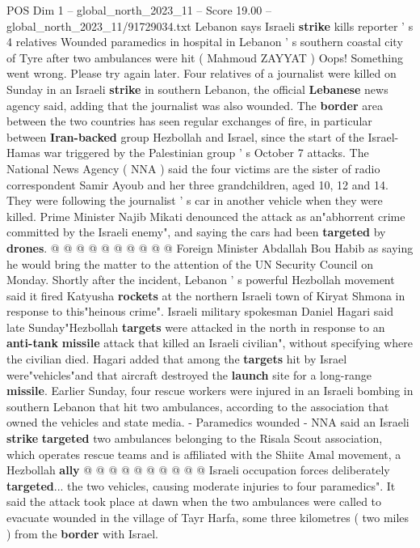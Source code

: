 \begin{textsample}{POS Dim 1 – global\_north\_2023\_11 – Score 19.00 – global\_north\_2023\_11/91729034.txt}  \label{ex:f1_pos_353}
Lebanon says Israeli \textbf{strike} kills reporter ' s 4 relatives Wounded paramedics in hospital in Lebanon ' s southern coastal city of Tyre after two ambulances were hit ( Mahmoud ZAYYAT ) Oops!
Something went wrong.
Please try again later.
Four relatives of a journalist were killed on Sunday in an Israeli \textbf{strike} in southern Lebanon, the official \textbf{Lebanese} news agency said, adding that the journalist was also wounded.
The \textbf{border} area between the two countries has seen regular exchanges of fire, in particular between \textbf{Iran-backed} group Hezbollah and Israel, since the start of the Israel-Hamas war triggered by the Palestinian group ' s October 7 attacks.
The National News Agency ( NNA ) said the four victims are the sister of radio correspondent Samir Ayoub and her three grandchildren, aged 10, 12 and 14.
They were following the journalist ' s car in another vehicle when they were killed.
Prime Minister Najib Mikati denounced the attack as an"abhorrent crime committed by the Israeli enemy", and saying the cars had been \textbf{targeted} by \textbf{drones}. @ @ @ @ @ @ @ @ @ @ Foreign Minister Abdallah Bou Habib as saying he would bring the matter to the attention of the UN Security Council on Monday.
Shortly after the incident, Lebanon ' s powerful Hezbollah movement said it fired Katyusha \textbf{rockets} at the northern Israeli town of Kiryat Shmona in response to this"heinous crime".
Israeli military spokesman Daniel Hagari said late Sunday"Hezbollah \textbf{targets} were attacked in the north in response to an \textbf{anti-tank} \textbf{missile} attack that killed an Israeli civilian", without specifying where the civilian died.
Hagari added that among the \textbf{targets} hit by Israel were"vehicles"and that aircraft destroyed the \textbf{launch} site for a long-range \textbf{missile}.
Earlier Sunday, four rescue workers were injured in an Israeli bombing in southern Lebanon that hit two ambulances, according to the association that owned the vehicles and state media. - Paramedics wounded - NNA said an Israeli \textbf{strike} \textbf{targeted} two ambulances belonging to the Risala Scout association, which operates rescue teams and is affiliated with the Shiite Amal movement, a Hezbollah \textbf{ally} @ @ @ @ @ @ @ @ @ @ Israeli occupation forces deliberately \textbf{targeted}... the two vehicles, causing moderate injuries to four paramedics".
It said the attack took place at dawn when the two ambulances were called to evacuate wounded in the village of Tayr Harfa, some three kilometres ( two miles ) from the \textbf{border} with Israel.

\end{textsample}
